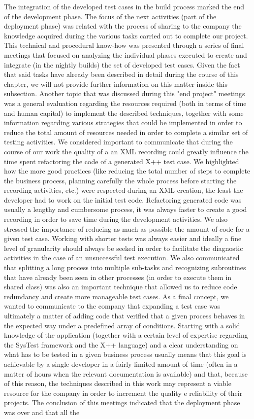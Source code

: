 The integration of the developed test cases in the build process marked the end of the development phase. The focus of the next activities (part of the deployment phase) was related with the process of sharing to the company the knowledge acquired during the various tasks carried out to complete our project. This technical and procedural know-how was presented through a series of final meetings that focused on analyzing the individual phases executed to create and integrate (in the nightly builds) the set of developed test cases. Given the fact that said tasks have already been described in detail during the course of this chapter, we will not provide further information on this matter inside this subsection. Another topic that was discussed during this "end project" meetings was a general evaluation regarding the resources required (both in terms of time and human capital) to implement the described techniques, together with some information regarding various strategies that could be implemented in order to reduce the total amount of resources needed in order to complete a similar set of testing activities. We considered important to communicate that during the course of our work the quality of a an XML recording could greatly influence the time spent refactoring the code of a generated X++ test case. We highlighted how the more good practices (like reducing the total number of steps to complete the business process, planning carefully the whole process before starting the recording activities, etc.) were respected during an XML creation, the least the developer had to work on the initial test code. Refactoring generated code was usually a lengthy and cumbersome process, it was always faster to create a good recording in order to save time during the development activities. We also stressed the importance of reducing as much as possible the amount of code for a given test case. Working with shorter tests was always easier and ideally a fine level of granularity should always be seeked in order to facilitate the diagnostic activities in the case of an unsuccessful test execution. We also communicated that splitting a long process into multiple sub-tasks and recognizing subroutines that have already been seen in other processes (in order to execute them in shared class) was also an important technique that allowed us to reduce code redundancy and create more manageable test cases. As a final concept, we wanted to communicate to the company that expanding a test case was ultimately a matter of adding code that verified that a given process behaves in the expected way under a predefined array of conditions. Starting with a solid knowledge of the application (together with a certain level of expertise regarding the SysTest framework and the X++ language) and a clear understanding on what has to be tested in a given business process usually means that this goal is achievable by a single developer in a fairly limited amount of time (often in a matter of hours when the relevant documentation is available) and that, because of this reason, the  techniques described in this work may represent a viable resource for the company in order to increment the quality e reliability of their projects. The conclusion of this meetings indicated that the deployment phase was over and that all the 
